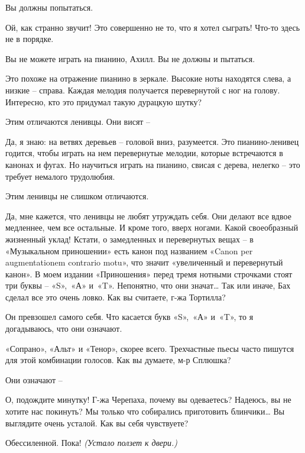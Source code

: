 \documentclass[../main.tex]{subfiles}
\begin{document}
\begin{dialogue}
 Вы должны попытаться.


 Ой, как странно звучит! Это совершенно не то, что я хотел сыграть! Что-то здесь не в порядке.

 Вы не можете играть на пианино, Ахилл. Вы не должны и пытаться.

 Это похоже на отражение пианино в зеркале. Высокие ноты находятся слева, а низкие \--- справа. Каждая мелодия получается перевернутой с ног на голову. Интересно, кто это придумал такую дурацкую шутку?

 Этим отличаются ленивцы. Они висят \---

 Да, я знаю: на ветвях деревьев \--- головой вниз, разумеется. Это пианино-ленивец годится, чтобы играть на нем перевернутые мелодии, которые встречаются в канонах и фугах. Но научиться играть на пианино, свисая с дерева, нелегко \--- это требует немалого трудолюбия.

 Этим ленивцы не слишком отличаются.

 Да, мне кажется, что ленивцы не любят утруждать себя. Они делают все вдвое медленнее, чем все остальные. И кроме того, вверх ногами. Какой своеобразный жизненный уклад! Кстати, о замедленных и перевернутых вещах \--- в «Музыкальном приношении» есть канон под названием «Canon per augmentationem contrario motu», что значит «увеличенный и перевернутый канон». В моем издании «Приношения» перед тремя нотными строчками стоят три буквы \--- «S»,~«А» и~«T». Непонятно, что они значат\ldots{} Так или иначе, Бах сделал все это очень ловко. Как вы считаете, г-жа Тортилла?

 Он превзошел самого себя. Что касается букв «S»,~«А» и~«T», то я догадываюсь, что они означают.

 «Сопрано», «Альт» и «Тенор», скорее всего. Трехчастные пьесы часто пишутся для этой комбинации голосов. Как вы думаете, м-р Сплюшка?

 Они означают \---

 О, подождите минутку! Г-жа Черепаха, почему вы одеваетесь? Надеюсь, вы не хотите нас покинуть? Мы только что собирались приготовить блинчики\ldots{} Вы выглядите очень усталой. Как вы себя чувствуете?

 Обессиленной. Пока! \emph{(Устало ползет к двери.)}


\end{dialogue}
\end{document}
